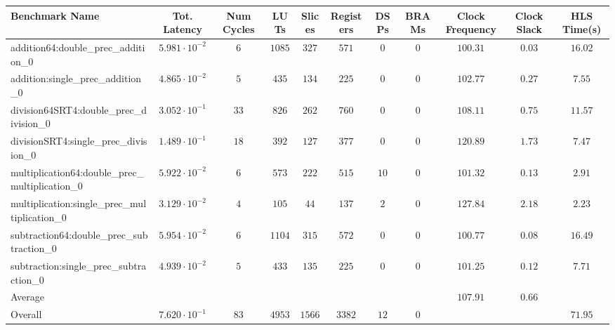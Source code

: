 \begin{tabular}{|l|c|c|c|c|c|c|c|c|c|c|}
\hline
Benchmark Name                                   & Tot. Latency            & Num Cycles & LUTs     & Slices   & Registers & DSPs   & BRAMs & Clock Frequency & Clock Slack & HLS Time(s) \\
\hline
addition64:double\_prec\_addition\_0             & $ 5.981 \cdot 10^{-2} $ & $ 6      $ & $ 1085 $ & $ 327  $ & $ 571   $ & $ 0  $ & $ 0 $ & $ 100.31      $ & $ 0.03    $ & $ 16.02   $ \\
addition:single\_prec\_addition\_0               & $ 4.865 \cdot 10^{-2} $ & $ 5      $ & $ 435  $ & $ 134  $ & $ 225   $ & $ 0  $ & $ 0 $ & $ 102.77      $ & $ 0.27    $ & $ 7.55    $ \\
division64SRT4:double\_prec\_division\_0         & $ 3.052 \cdot 10^{-1} $ & $ 33     $ & $ 826  $ & $ 262  $ & $ 760   $ & $ 0  $ & $ 0 $ & $ 108.11      $ & $ 0.75    $ & $ 11.57   $ \\
divisionSRT4:single\_prec\_division\_0           & $ 1.489 \cdot 10^{-1} $ & $ 18     $ & $ 392  $ & $ 127  $ & $ 377   $ & $ 0  $ & $ 0 $ & $ 120.89      $ & $ 1.73    $ & $ 7.47    $ \\
multiplication64:double\_prec\_multiplication\_0 & $ 5.922 \cdot 10^{-2} $ & $ 6      $ & $ 573  $ & $ 222  $ & $ 515   $ & $ 10 $ & $ 0 $ & $ 101.32      $ & $ 0.13    $ & $ 2.91    $ \\
multiplication:single\_prec\_multiplication\_0   & $ 3.129 \cdot 10^{-2} $ & $ 4      $ & $ 105  $ & $ 44   $ & $ 137   $ & $ 2  $ & $ 0 $ & $ 127.84      $ & $ 2.18    $ & $ 2.23    $ \\
subtraction64:double\_prec\_subtraction\_0       & $ 5.954 \cdot 10^{-2} $ & $ 6      $ & $ 1104 $ & $ 315  $ & $ 572   $ & $ 0  $ & $ 0 $ & $ 100.77      $ & $ 0.08    $ & $ 16.49   $ \\
subtraction:single\_prec\_subtraction\_0         & $ 4.939 \cdot 10^{-2} $ & $ 5      $ & $ 433  $ & $ 135  $ & $ 225   $ & $ 0  $ & $ 0 $ & $ 101.25      $ & $ 0.12    $ & $ 7.71    $ \\
\hline
Average                                          & $                     $ & $        $ & $      $ & $      $ & $       $ & $    $ & $   $ & $ 107.91      $ & $ 0.66    $ & $         $ \\
\hline
Overall                                          & $ 7.620 \cdot 10^{-1} $ & $ 83     $ & $ 4953 $ & $ 1566 $ & $ 3382  $ & $ 12 $ & $ 0 $ & $             $ & $         $ & $ 71.95   $ \\
\hline
\end{tabular}
